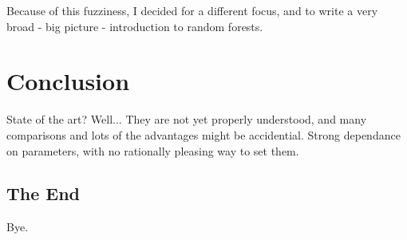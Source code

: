 \documentclass[a4paper,man,12pt,apacite]{apa6} %
\begin{document}
Because of this fuzziness, I decided for a different focus, and to write
a very broad - big picture - introduction to random forests.

\section{Conclusion}
State of the art? Well... They are not yet properly understood, and
many comparisons and lots of the advantages might be accidential.
Strong dependance on parameters, with no rationally pleasing way to set them.

\subsection{The End}
Bye.


\end{document}
